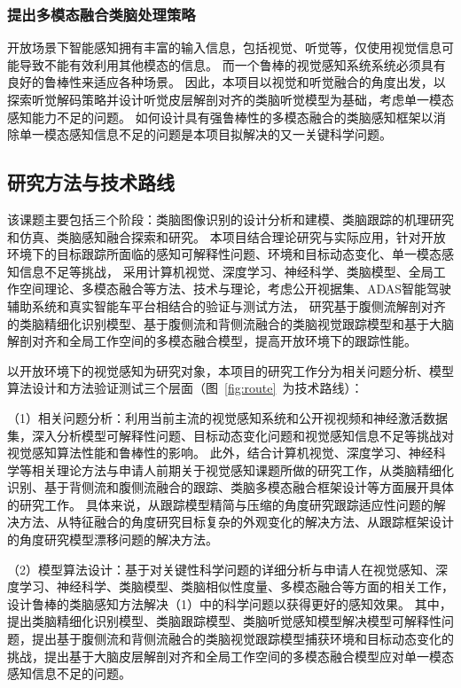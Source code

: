 \documentclass[a4paper,zihao=-4]{article}
\begin{document}
\subsubsection{提出多模态融合类脑处理策略}
开放场景下智能感知拥有丰富的输入信息，包括视觉、听觉等，仅使用视觉信息可能导致不能有效利用其他模态的信息。
而一个鲁棒的视觉感知系统系统必须具有良好的鲁棒性来适应各种场景。
因此，本项目以视觉和听觉融合的角度出发，以探索听觉解码策略并设计听觉皮层解剖对齐的类脑听觉模型为基础，考虑单一模态感知能力不足的问题。
如何设计具有强鲁棒性的多模态融合的类脑感知框架以消除单一模态感知信息不足的问题是本项目拟解决的又一关键科学问题。



\textcolor{NsfcBlue}{\subsection{研究方法与技术路线}}
该课题主要包括三个阶段：类脑图像识别的设计分析和建模、类脑跟踪的机理研究和仿真、类脑感知融合探索和研究。
本项目结合理论研究与实际应用，针对开放环境下的目标跟踪所面临的感知可解释性问题、环境和目标动态变化、单一模态感知信息不足等挑战，
采用计算机视觉、深度学习、神经科学、类脑模型、全局工作空间理论、多模态融合等方法、技术与理论，考虑公开视据集、ADAS智能驾驶辅助系统和真实智能车平台相结合的验证与测试方法，
研究基于腹侧流解剖对齐的类脑精细化识别模型、基于腹侧流和背侧流融合的类脑视觉跟踪模型和基于大脑解剖对齐和全局工作空间的多模态融合模型，提高开放环境下的跟踪性能。

以开放环境下的视觉感知为研究对象，本项目的研究工作分为相关问题分析、模型算法设计和方法验证测试三个层面（图~\ref{fig:route}~为技术路线）：

（1）相关问题分析：利用当前主流的视觉感知系统和公开视视频和神经激活数据集，深入分析模型可解释性问题、目标动态变化问题和视觉感知信息不足等挑战对视觉感知算法性能和鲁棒性的影响。
此外，结合计算机视觉、深度学习、神经科学等相关理论方法与申请人前期关于视觉感知课题所做的研究工作，从类脑精细化识别、基于背侧流和腹侧流融合的跟踪、类脑多模态融合框架设计等方面展开具体的研究工作。
具体来说，从跟踪模型精简与压缩的角度研究跟踪适应性问题的解决方法、从特征融合的角度研究目标复杂的外观变化的解决方法、从跟踪框架设计的角度研究模型漂移问题的解决方法。

（2）模型算法设计：基于对关键性科学问题的详细分析与申请人在视觉感知、深度学习、神经科学、类脑模型、类脑相似性度量、多模态融合等方面的相关工作，设计鲁棒的类脑感知方法解决（1）中的科学问题以获得更好的感知效果。
其中，提出类脑精细化识别模型、类脑跟踪模型、类脑听觉感知模型解决模型可解释性问题，提出基于腹侧流和背侧流融合的类脑视觉跟踪模型捕获环境和目标动态变化的挑战，提出基于大脑皮层解剖对齐和全局工作空间的多模态融合模型应对单一模态感知信息不足的问题。
\end{document}
